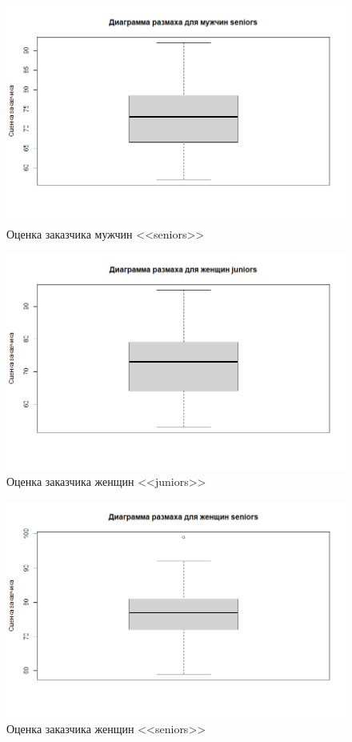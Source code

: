\begin{figure}[H]
	\centering
	\includegraphics[width=\linewidth]{figboxms}
	\caption{Оценка заказчика мужчин <<seniors>>}
\end{figure}

\begin{figure}[H]
	\centering
	\includegraphics[width=\linewidth]{figboxwj}
	\caption{Оценка заказчика женщин <<juniors>>}
\end{figure}

\begin{figure}[H]
	\centering
	\includegraphics[width=\linewidth]{figboxws}
	\caption{Оценка заказчика женщин <<seniors>>}
\end{figure}

